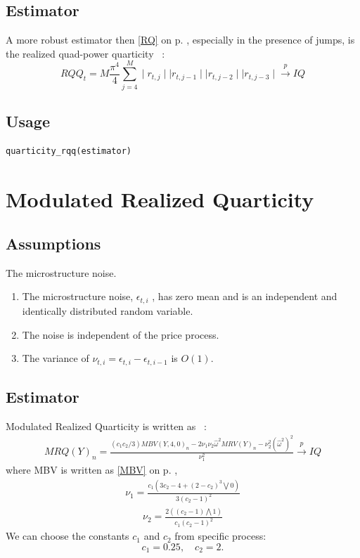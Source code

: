 \documentclass[letterpaper]{report}
\begin{document}
\subsection{Estimator}
A more robust estimator then \ref{RQ} on p. \pageref{RQ}, especially
in the presence of jumps, is the realized quad-power quarticity ~\cite[Corsi et al., 2005]{Corsi_Kretschmer_Mittnik_Pigorsch}:
\begin{equation}
RQQ_t = M\frac{\pi^4}{4} \sum_{j=4}^M \mid r_{t,j} \mid \mid r_{t,j-1} \mid \mid
r_{t,j-2} \mid \mid r_{t,j-3} \mid \stackrel{p}{\to} IQ
\end{equation}
  \subsection{Usage}
\begin{lstlisting}
quarticity_rqq(estimator)
\end{lstlisting}
\thispagestyle{plain}
\section{Modulated Realized Quarticity}
\subsection{Assumptions}
The microstructure noise.
\begin{enumerate}
\item The microstructure noise, $\epsilon_{t,i}$ , has zero mean and is an
independent and identically distributed random variable.
\item The noise is independent of the price process.
\item The variance of $\nu_{t,i} = \epsilon_{t,i} - \epsilon_{t,i-1}$ is
$O(1)$.
\end{enumerate}
\subsection{Estimator}
Modulated Realized Quarticity is written as ~\cite[Podolskij and Vetter, 2009]{Podolskij_Vetter}:
\begin{gather}
MRQ(Y)_n = \frac{(c_1 c_2/3)MBV(Y,4,0)_n - 2\nu_1\nu_2\hat{\omega}^2 MRV(Y)_n - \nu_2^2(\hat{\omega}^2)^2}{\nu_1^2} \stackrel{p}{\to} IQ
\end{gather}
where MBV is written as \ref{MBV} on p. \pageref{MBV},
\begin{gather}
\nu_1 = \frac{c_1(3c_2-4+(2-c_2)^3\bigvee 0)}{3(c_2-1)^2}
\end{gather}
\begin{gather}
\nu_2 = \frac{2((c_2-1)\bigwedge 1)}{c_1(c_2-1)^2}
\end{gather}
We can choose the constants $c_1$ and $c_2$ from specific process:
\begin{equation}
c_1 = 0.25, \quad
c_2 = 2.
\end{equation}
\end{document}
